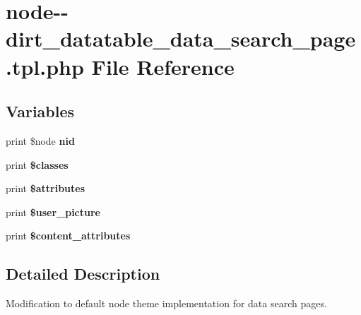 \hypertarget{node--dirt__datatable__data__search__page_8tpl_8php}{}\section{node-\/-\/dirt\+\_\+datatable\+\_\+data\+\_\+search\+\_\+page.tpl.\+php File Reference}
\label{node--dirt__datatable__data__search__page_8tpl_8php}
\subsection*{Variables}
\begin{DoxyCompactItemize}
\item 
\mbox{\label{node--dirt__datatable__data__search__page_8tpl_8php_aff83bc4c67cdf5b085d181488eea273f}} 
print \$node {\bfseries nid}
\item 
\mbox{\label{node--dirt__datatable__data__search__page_8tpl_8php_a6d48ecbdbc70ca1812e665169b5fa1e2}} 
print {\bfseries \$classes}
\item 
\mbox{\label{node--dirt__datatable__data__search__page_8tpl_8php_a9c88c4272fa40546577b45392a0b3cd3}} 
print {\bfseries \$attributes}
\item 
\mbox{\label{node--dirt__datatable__data__search__page_8tpl_8php_a2662269aca0f9faedd1ee9e41828ea4c}} 
print {\bfseries \$user\+\_\+picture}
\item 
\mbox{\label{node--dirt__datatable__data__search__page_8tpl_8php_ae2ee2e16f11937564281332a76a658e8}} 
print {\bfseries \$content\+\_\+attributes}
\end{DoxyCompactItemize}


\subsection{Detailed Description}
Modification to default node theme implementation for data search pages.

